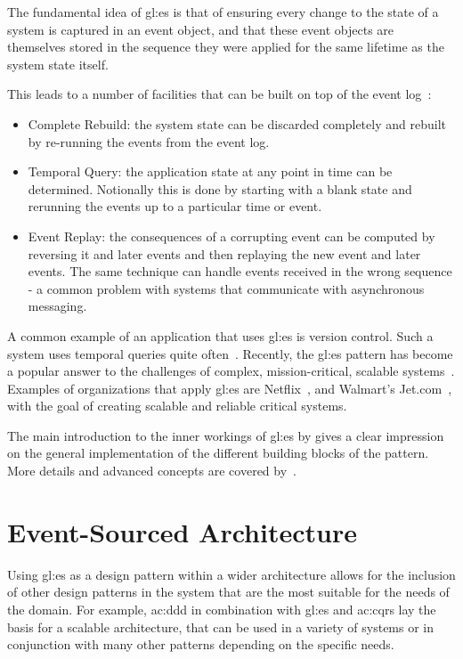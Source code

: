 The fundamental idea of \gls{gl:es} is that of ensuring every change to the state of a system is captured in an event object, and that these event objects are themselves stored in the sequence they were applied for the same lifetime as the system state itself.

This leads to a number of facilities that can be built on top of the event log~\citep{fowleres}:

\begin{itemize}
  \item Complete Rebuild: the system state can be discarded completely and rebuilt by re-running the events from the event log.
  \item Temporal Query: the application state at any point in time can be determined. Notionally this is done by starting with a blank state and rerunning the events up to a particular time or event.
  \item Event Replay: the consequences of a corrupting event can be computed by reversing it and later events and then replaying the new event and later events. The same technique can handle events received in the wrong sequence - a common problem with systems that communicate with asynchronous messaging.
\end{itemize}

A common example of an application that uses \gls{gl:es} is version control. Such a system uses temporal queries quite often~\citep{fowleres}. Recently, the \gls{gl:es} pattern has become a popular answer to the challenges of complex, mission-critical, scalable systems~\citep{OVEREEM2021110970}. Examples of organizations that apply \gls{gl:es} are Netflix~\citep{avery2017scaling}, and Walmart’s Jet.com~\citep{jet2017scaling}, with the goal of creating scalable and reliable critical systems.

The main introduction to the inner workings of \gls{gl:es} by \citep{fowleres} gives a clear impression on the general implementation of the different building blocks of the pattern. More details and advanced concepts are covered by~\citep{richardson2018microservices}.

\pagebreak

\section{Event-Sourced Architecture}\label{sec:esa}

Using \gls{gl:es} as a design pattern within a wider architecture allows for the inclusion of other design patterns in the system that are the most suitable for the needs of the domain. For example, \gls{ac:ddd} in combination with \gls{gl:es} and \gls{ac:cqrs} lay the basis for a scalable architecture, that can be used in a variety of systems or in conjunction with many other patterns depending on the specific needs.

